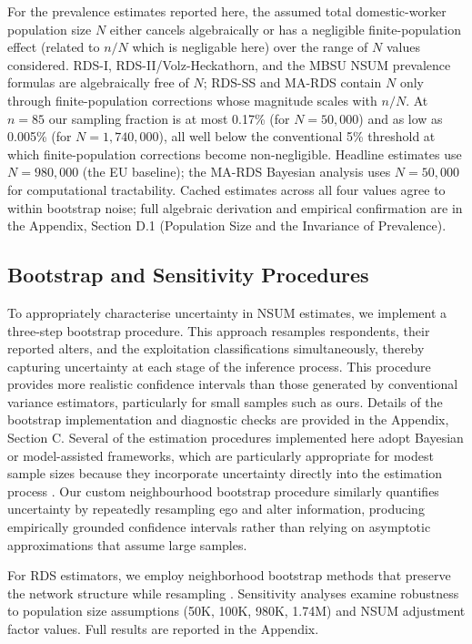 \documentclass[
  12pt,
  letterpaper,
  DIV=11,
  numbers=noendperiod]{scrartcl}
\begin{document}
For the prevalence estimates reported here, the assumed total
domestic-worker population size \(N\) either cancels algebraically or
has a negligible finite-population effect (related to \(n/N\) which is
negligable here) over the range of \(N\) values considered. RDS-I,
RDS-II/Volz-Heckathorn, and the MBSU NSUM prevalence formulas are
algebraically free of \(N\); RDS-SS and MA-RDS contain \(N\) only
through finite-population corrections whose magnitude scales with
\(n/N\). At \(n = 85\) our sampling fraction is at most 0.17\% (for
\(N = 50{,}000\)) and as low as 0.005\% (for \(N = 1{,}740{,}000\)), all
well below the conventional 5\% threshold at which finite-population
corrections become non-negligible. Headline estimates use
\(N = 980{,}000\) (the EU baseline); the MA-RDS Bayesian analysis uses
\(N = 50{,}000\) for computational tractability. Cached estimates across
all four values agree to within bootstrap noise; full algebraic
derivation and empirical confirmation are in the Appendix, Section D.1
(Population Size and the Invariance of Prevalence).

\subsection{Bootstrap and Sensitivity Procedures}\label{sec-bootstrap}

To appropriately characterise uncertainty in NSUM estimates, we
implement a three-step bootstrap procedure. This approach resamples
respondents, their reported alters, and the exploitation classifications
simultaneously, thereby capturing uncertainty at each stage of the
inference process. This procedure provides more realistic confidence
intervals than those generated by conventional variance estimators,
particularly for small samples such as ours. Details of the bootstrap
implementation and diagnostic checks are provided in the Appendix,
Section C. Several of the estimation procedures implemented here adopt
Bayesian or model-assisted frameworks, which are particularly
appropriate for modest sample sizes because they incorporate uncertainty
directly into the estimation process \autocite{gile18-methods}. Our
custom neighbourhood bootstrap procedure similarly quantifies
uncertainty by repeatedly resampling ego and alter information,
producing empirically grounded confidence intervals rather than relying
on asymptotic approximations that assume large samples.

For RDS estimators, we employ neighborhood bootstrap methods that
preserve the network structure while resampling
\autocite{yauc22-neighborhood}. Sensitivity analyses examine robustness
to population size assumptions (50K, 100K, 980K, 1.74M) and NSUM
adjustment factor values. Full results are reported in the Appendix.
\end{document}
